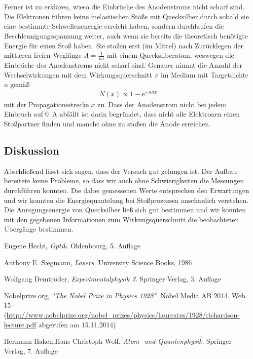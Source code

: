 \documentclass[11pt, a4paper]{article}
\begin{document}
\\
\\
Ferner ist zu erklären, wieso die Einbrüche des Anodenstroms nicht scharf sind.
Die Elektronen führen keine inelastischen Stöße mit Quecksilber durch sobald sie eine bestimmte Schwellenenergie erreicht haben, sondern durchlaufen die Beschleunigungsspannung weiter, auch wenn sie bereits die theoretisch benötigte Energie für einen Stoß haben. Sie stoßen erst (im Mittel) nach Zurücklegen der mittleren freien Weglänge $\Lambda = \frac{1}{n \sigma}$ mit einem Quecksilberatom, weswegen die Einbrüche des Anodenstroms nicht scharf sind.
Genauer nimmt die Anzahl der Wechselwirkungen mit dem Wirkungsquerschnitt $\sigma$ im Medium mit Targetdichte $n$ gemäß
\begin{align*}
N(x) \propto 1-\mathrm{e}^{-n \sigma x}
\end{align*}
mit der Propagationsstrecke $x$ zu.
Dass der Anodenstrom nicht bei jedem Einbruch auf \SI{0}{\ampere} abfällt ist darin begründet, dass nicht alle Elektronen einen Stoßpartner finden und manche ohne zu stoßen die Anode erreichen.
\subsection{Diskussion}

Abschließend lässt sich sagen, dass der Versuch gut gelungen ist.
Der Aufbau bereitete keine Probleme, so dass wir auch ohne Schwierigkeiten die Messungen durchführen konnten.
Die dabei gemessenen Werte entsprechen den Erwartungen und wir konnten die Energiequantelung bei Stoßprozessen anschaulich verstehen.
Die Anregungsenergie von Quecksilber ließ sich gut bestimmen und wir konnten mit den gegebenen Informationen zum Wirkungsquerschnitt die beobachteten Übergänge bestimmen.

\clearpage


\begin{thebibliography}{9}

	Eugene Hecht,
	\emph{Optik}.
	Oldenbourg,
	5. Auflage
	
	Anthony E. Siegmann,
	\emph{Lasers}.
	University Science Books,
	1986
	
	Wolfgang Demtröder,
	\emph{Experimentalphysik 3}.
	Springer Verlag,
	3. Auflage

 Nobelprize.org,
 \emph{"The Nobel Prize in Physics 1928"}.
 Nobel Media AB 2014. Web. 15\\
 (\url{http://www.nobelprize.org/nobel_prizes/physics/laureates/1928/richardson-lecture.pdf} abgerufen am 15.11.2014)
 
	Hermann Haken,Hans Christoph Wolf,
	\emph{Atom- und Quantenphysik}.
	Springer Verlag,
	7. Auflage
 
\end{thebibliography}
\end{document}
